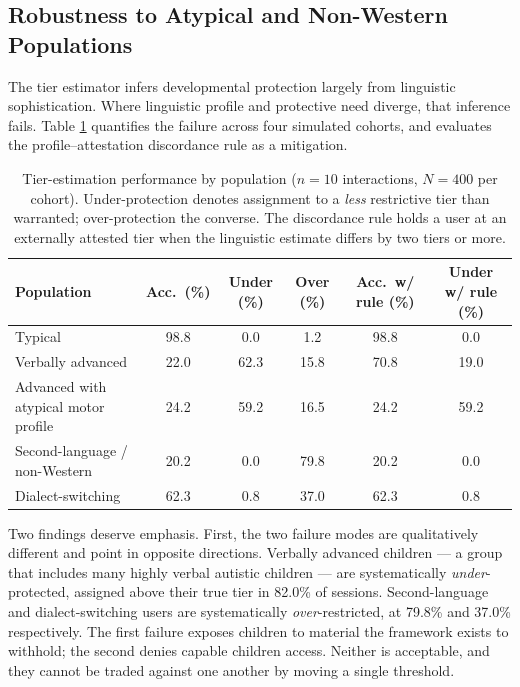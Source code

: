 \documentclass[fleqn,10pt]{wlscirep}
\begin{document}
\subsection*{Robustness to Atypical and Non-Western Populations}

The tier estimator infers developmental protection largely from linguistic sophistication. Where linguistic profile and protective need diverge, that inference fails. Table \ref{tab:populations} quantifies the failure across four simulated cohorts, and evaluates the profile--attestation discordance rule as a mitigation.

\begin{table}[H]
\centering
\caption{Tier-estimation performance by population ($n = 10$ interactions, $N = 400$ per cohort). Under-protection denotes assignment to a \emph{less} restrictive tier than warranted; over-protection the converse. The discordance rule holds a user at an externally attested tier when the linguistic estimate differs by two tiers or more.}
\label{tab:populations}
\small
\begin{tabular}{lccccc}
\hline
\textbf{Population} & \textbf{Acc.\ (\%)} & \textbf{Under (\%)} & \textbf{Over (\%)} & \textbf{Acc.\ w/ rule (\%)} & \textbf{Under w/ rule (\%)} \\
\hline
Typical                     & 98.8 & 0.0  & 1.2  & 98.8 & 0.0  \\
Verbally advanced           & 22.0 & 62.3 & 15.8 & 70.8 & 19.0 \\
Advanced with atypical motor profile & 24.2 & 59.2 & 16.5 & 24.2 & 59.2 \\
Second-language / non-Western & 20.2 & 0.0  & 79.8 & 20.2 & 0.0  \\
Dialect-switching           & 62.3 & 0.8  & 37.0 & 62.3 & 0.8  \\
\hline
\end{tabular}
\end{table}

Two findings deserve emphasis. First, the two failure modes are qualitatively different and point in opposite directions. Verbally advanced children --- a group that includes many highly verbal autistic children --- are systematically \emph{under}-protected, assigned above their true tier in 82.0\% of sessions. Second-language and dialect-switching users are systematically \emph{over}-restricted, at 79.8\% and 37.0\% respectively. The first failure exposes children to material the framework exists to withhold; the second denies capable children access. Neither is acceptable, and they cannot be traded against one another by moving a single threshold.
\end{document}
